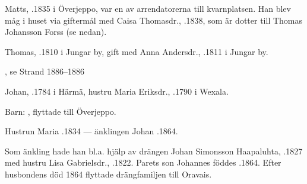 Matts, .1835 i Överjeppo, var en av arrendatorerna till kvarnplatsen. Han blev måg i huset via giftermål med Caisa Thomasdr., .1838, som är dotter till Thomas Johansson Forss (se nedan).
\begin{jhchildren}
  \item {}
  \item {}
  \item {}
  \item {}
\end{jhchildren}


Thomas, .1810 i Jungar by, gift med Anna Andersdr., .1811 i Jungar by.
\begin{jhchildren}
  \item {}
  \item {}
  \item {}
  \item {}
  \item {}
  \item {}
  \item {}
  \item {}, se Strand 1886--1886
\end{jhchildren}


Johan, .1784 i Härmä, hustru Maria Eriksdr., .1790 i Wexala.

Barn: , flyttade till Överjeppo.

Hustrun Maria .1834 --- änklingen Johan .1864.

Som änkling hade han bl.a. hjälp av drängen Johan Simonsson Haapaluhta, .1827 med hustru Lisa Gabrielsdr., .1822. Parets son Johannes föddes .1864. Efter husbondens död 1864 flyttade drängfamiljen till Oravais.



